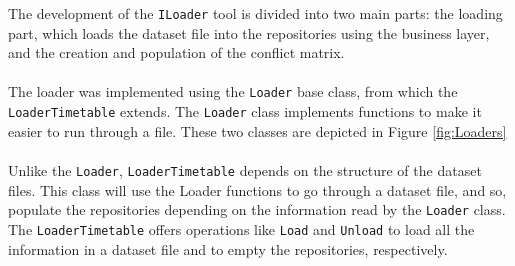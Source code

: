 The development of the \verb+ILoader+ tool is divided into two main parts: the loading part, which loads the dataset file into the repositories using the business layer, and the creation and population of the conflict matrix.\\
\\
The loader was implemented using the \verb+Loader+ base class, from which the \verb+LoaderTimetable+ extends. The \verb+Loader+ class implements functions to make it easier to run through a file. These two classes are depicted in Figure \ref{fig:Loaders}\\
\\
Unlike the \verb+Loader+, \verb+LoaderTimetable+ depends on the structure of the dataset files. This class will use the Loader functions to go through a dataset file, and so, populate the repositories depending on the information read by the \verb+Loader+ class. The \verb+LoaderTimetable+ offers operations like \verb+Load+ and \verb+Unload+ to load all the information in a dataset file and to empty the repositories, respectively.\\
\\
